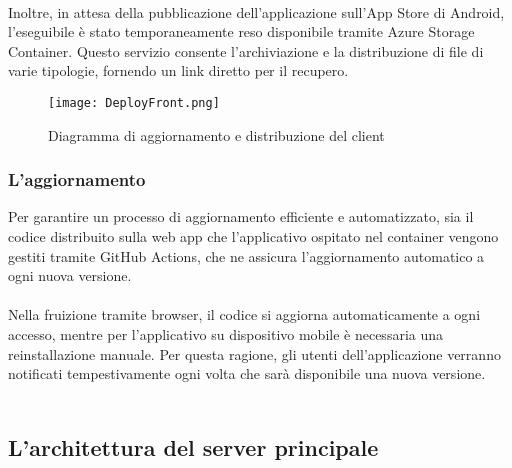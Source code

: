 \\
Inoltre, in attesa della pubblicazione dell’applicazione sull’App Store di Android, l’eseguibile è stato temporaneamente reso disponibile tramite Azure Storage Container.
Questo servizio consente l’archiviazione e la distribuzione di file di varie tipologie, fornendo un link diretto per il recupero.
\clearpage
\begin{figure}[h!]
    \begin{center}
        \texttt{[image: DeployFront.png]}
        \caption{Diagramma di aggiornamento e distribuzione del client}
    \end{center}
\end{figure}

\subsubsection{L'aggiornamento}
Per garantire un processo di aggiornamento efficiente e automatizzato,
sia il codice distribuito sulla web app che l’applicativo ospitato nel container vengono gestiti tramite GitHub Actions,
che ne assicura l’aggiornamento automatico a ogni nuova versione. \\
\\

Nella fruizione tramite browser, il codice si aggiorna automaticamente a ogni accesso, mentre per l’applicativo su dispositivo mobile è necessaria una reinstallazione manuale.
Per questa ragione, gli utenti dell’applicazione verranno notificati tempestivamente ogni volta che sarà disponibile una nuova versione.\\
\\
\clearpage








\subsection{L’architettura del server principale}

